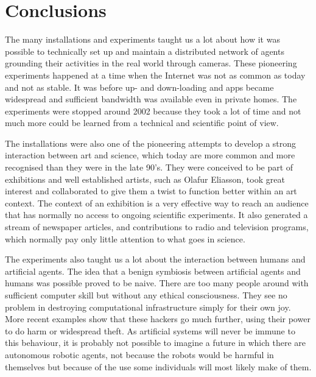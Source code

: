 \section{Conclusions}

The many installations and experiments taught us a lot about how it was possible to technically set up 
and maintain a distributed network of agents grounding their activities in the real world through cameras. 
These pioneering experiments happened at a time when the Internet was not as common as today and not as stable. 
It was before up- and down-loading and apps became widespread and sufficient bandwidth was available 
even in private homes. The experiments were stopped around 2002 because
they took a lot of time and not much more could be learned from a technical and scientific point of view. 

The installations were also one of the pioneering attempts to develop a strong interaction between art and science, 
which today are more common and more recognised than they were in the late 90's.
They were conceived to be part of exhibitions and well established artists, such as Olafur Eliasson, took great 
interest and collaborated to give them a twist to function better within an art context. 
The context of an exhibition is a very effective way to reach an audience
that has normally no access to ongoing scientific experiments. It also generated a stream of newspaper articles, 
and contributions to radio and television programs, which normally pay only little attention to what goes in science. 

The experiments also taught us a lot about the interaction between humans and artificial agents. The idea that 
a benign symbiosis between artificial agents and humans was possible proved to be naive. There are too many 
people around with sufficient computer 
skill but without any ethical consciousness. They see no problem in destroying computational infrastructure simply for 
their own joy. More recent examples show that these hackers go much further, using their power to do harm or widespread
theft. As artificial systems will never be immune to this behaviour, it is probably not possible to imagine a future in which 
there are autonomous robotic agents, not because the robots would be harmful in themselves but because of 
the use some individuals will most likely make of them. 

